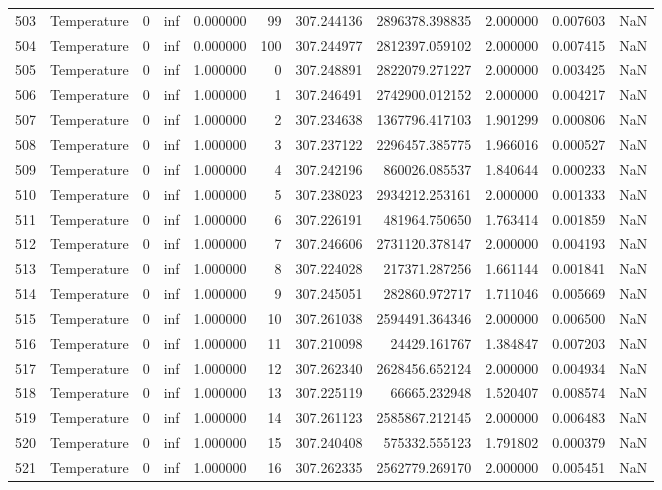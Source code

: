 \begin{tabular}{llrrrrrrrrr}
503 & Temperature & 0 & inf & 0.000000 & 99 & 307.244136 & 2896378.398835 & 2.000000 & 0.007603 & NaN \\
504 & Temperature & 0 & inf & 0.000000 & 100 & 307.244977 & 2812397.059102 & 2.000000 & 0.007415 & NaN \\
505 & Temperature & 0 & inf & 1.000000 & 0 & 307.248891 & 2822079.271227 & 2.000000 & 0.003425 & NaN \\
506 & Temperature & 0 & inf & 1.000000 & 1 & 307.246491 & 2742900.012152 & 2.000000 & 0.004217 & NaN \\
507 & Temperature & 0 & inf & 1.000000 & 2 & 307.234638 & 1367796.417103 & 1.901299 & 0.000806 & NaN \\
508 & Temperature & 0 & inf & 1.000000 & 3 & 307.237122 & 2296457.385775 & 1.966016 & 0.000527 & NaN \\
509 & Temperature & 0 & inf & 1.000000 & 4 & 307.242196 & 860026.085537 & 1.840644 & 0.000233 & NaN \\
510 & Temperature & 0 & inf & 1.000000 & 5 & 307.238023 & 2934212.253161 & 2.000000 & 0.001333 & NaN \\
511 & Temperature & 0 & inf & 1.000000 & 6 & 307.226191 & 481964.750650 & 1.763414 & 0.001859 & NaN \\
512 & Temperature & 0 & inf & 1.000000 & 7 & 307.246606 & 2731120.378147 & 2.000000 & 0.004193 & NaN \\
513 & Temperature & 0 & inf & 1.000000 & 8 & 307.224028 & 217371.287256 & 1.661144 & 0.001841 & NaN \\
514 & Temperature & 0 & inf & 1.000000 & 9 & 307.245051 & 282860.972717 & 1.711046 & 0.005669 & NaN \\
515 & Temperature & 0 & inf & 1.000000 & 10 & 307.261038 & 2594491.364346 & 2.000000 & 0.006500 & NaN \\
516 & Temperature & 0 & inf & 1.000000 & 11 & 307.210098 & 24429.161767 & 1.384847 & 0.007203 & NaN \\
517 & Temperature & 0 & inf & 1.000000 & 12 & 307.262340 & 2628456.652124 & 2.000000 & 0.004934 & NaN \\
518 & Temperature & 0 & inf & 1.000000 & 13 & 307.225119 & 66665.232948 & 1.520407 & 0.008574 & NaN \\
519 & Temperature & 0 & inf & 1.000000 & 14 & 307.261123 & 2585867.212145 & 2.000000 & 0.006483 & NaN \\
520 & Temperature & 0 & inf & 1.000000 & 15 & 307.240408 & 575332.555123 & 1.791802 & 0.000379 & NaN \\
521 & Temperature & 0 & inf & 1.000000 & 16 & 307.262335 & 2562779.269170 & 2.000000 & 0.005451 & NaN \\

\end{tabular}
